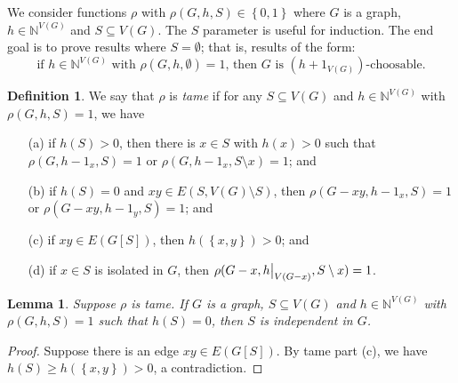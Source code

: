 \documentclass[12pt]{article}
\theoremstyle{plain}
\newtheorem{lem}[thm]{Lemma}
\theoremstyle{definition}
\newtheorem{defn}{Definition}
\theoremstyle{remark}
\newcommand{\IN}{\mathbb{N}}
\newcommand{\set}[1]{\left\{ #1 \right\}}
\newcommand\restr[2]{{%
  \left.\kern-\nulldelimiterspace %
  #1 %
  \vphantom{\big|} %
  \right|_{#2} %
  }}
\begin{document}
We consider functions $\rho$ with $\rho(G,h,S) \in \set{0,1}$ where $G$ is a graph, $h \in \IN^{V(G)}$ and $S \subseteq V(G)$.  The $S$ parameter is useful for induction. The end goal is to prove results where $S=\emptyset$; that is, results of the form:
\[\text{if } h \in \IN^{V(G)} \text{ with } \rho(G, h, \emptyset) = 1\text{, then } G \text{ is } (h + 1_{V(G)})\text{-choosable}.\]
\newpage
\begin{defn}\label{tame}
	We say that $\rho$ is \emph{tame} if for any $S \subseteq V(G)$ and $h \in \IN^{V(G)}$ with $\rho(G, h, S) = 1$, we have
\begin{enumerate}
	\item[(a)] if $h(S) > 0$, then there is $x \in S$ with $h(x) > 0$ such that $\rho(G, h - 1_x, S) = 1$ or $\rho(G, h - 1_x, S \setminus x) = 1$; and
	\item[(b)] if $h(S) = 0$ and $xy \in E(S, V(G)\setminus S)$, then $\rho(G-xy, h - 1_x, S) = 1$ or $\rho(G-xy, h - 1_y, S) = 1$; and
	\item[(c)] if $xy \in E(G[S])$, then $h(\set{x,y}) > 0$; and
	\item[(d)] if $x \in S$ is isolated in $G$, then $\rho(G - x, \restr{h}{V(G-x)}, S\setminus x) = 1$.
\end{enumerate}
\end{defn}

\begin{lem}\label{ZeroMeansIndependent}
	Suppose $\rho$ is tame. If $G$ is a graph, $S \subseteq V(G)$ and $h \in \IN^{V(G)}$ with $\rho(G, h, S) = 1$ such that $h(S) = 0$, then $S$ is independent in $G$.
\end{lem}
\begin{proof}
	Suppose there is an edge $xy \in E(G[S])$.  By tame part (c), we have $h(S) \ge h(\set{x,y}) > 0$, a contradiction.
\end{proof}
\end{document}
